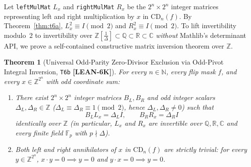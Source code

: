 \documentclass[11pt,reqno]{amsart}
\newcommand{\code}[1]{\textnormal{\texttt{\small\nolinkurl{#1}}}}
\theoremstyle{plain}
\newtheorem{theorem}{Theorem}[section]
\theoremstyle{definition}
\theoremstyle{remark}
\newcommand{\tagLean}{\mbox{\textsf{\textbf{\color{oiBlue}[LEAN-6K]}}}}
\newcommand{\CD}{\mathrm{CD}}
\newcommand{\R}{\mathbb{R}}
\newcommand{\C}{\mathbb{C}}
\newcommand{\Z}{\mathbb{Z}}
\newcommand{\Q}{\mathbb{Q}}
\newcommand{\F}{\mathbb{F}}
\newcommand{\N}{\mathbb{N}}
\begin{document}
Let \code{leftMulMat} $L_x$ and \code{rightMulMat} $R_x$ be the $2^n \times 2^n$ integer matrices
representing left and right multiplication by $x$ in $\CD_n(f)$. By Theorem~\ref{thm:t6a},
$L_x^2 \equiv I \pmod 2$ and $R_x^2 \equiv I \pmod 2$. To lift invertibility modulo~$2$ to
invertibility over $\Z[\tfrac{1}{\Delta}] \subset \Q \subset \R \subset \C$ \emph{without}
Mathlib's determinant API, we prove a self-contained constructive matrix inversion theorem over $\Z$.

\begin{theorem}[Universal Odd-Parity Zero-Divisor Exclusion via Odd-Pivot Integral Inversion, \texttt{T6b} \tagLean]
\label{thm:t6b}
For every $n \in \N$, every flip mask $f$, and every $x \in \Z^{2^n}$ with odd coordinate sum:
\begin{enumerate}[leftmargin=2em]
  \item There exist $2^n \times 2^n$ integer matrices $B_L, B_R$ and \emph{odd} integer scalars
    $\Delta_L, \Delta_R \in \Z$ ($\Delta_L \equiv \Delta_R \equiv 1 \pmod 2$, hence
    $\Delta_L, \Delta_R \neq 0$) such that
    \begin{equation}
    \label{eq:integral_inv}
      B_L L_x = \Delta_L I, \qquad B_R R_x = \Delta_R I
    \end{equation}
    identically over $\Z$ (in particular, $L_x$ and $R_x$ are invertible over $\Q, \R, \C$ and
    every finite field $\F_p$ with $p \nmid \Delta$).
  \item Both left and right annihilators of $x$ in $\CD_n(f)$ are strictly trivial:
    for every $y \in \Z^{2^n}$, $x \cdot y = 0 \implies y = 0$ and $y \cdot x = 0 \implies y = 0$.
\end{enumerate}
\end{theorem}
\end{document}

